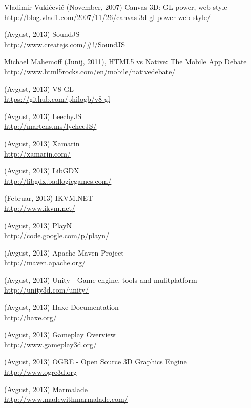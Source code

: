 \begin{thebibliography}{1}
 Vladimir Vukićević (November, 2007) Canvas 3D: GL power, web-style
\\ \url{http://blog.vlad1.com/2007/11/26/canvas-3d-gl-power-web-style/}

 (Avgust, 2013) SoundJS
\\ \url{http://www.createjs.com/\#!/SoundJS}

 Michael Mahemoff (Junij, 2011), HTML5 vs Native: The Mobile App Debate
\\ \url{http://www.html5rocks.com/en/mobile/nativedebate/}

 (Avgust, 2013) V8-GL 
\\ \url{https://github.com/philogb/v8-gl}

 (Avgust, 2013) LeechyJS 
\\ \url{http://martens.ms/lycheeJS/}

 (Avgust, 2013) Xamarin
\\ \url{http://xamarin.com/}

 (Avgust, 2013) LibGDX 
\\ \url{http://libgdx.badlogicgames.com/}

 (Februar, 2013) IKVM.NET
\\ \url{http://www.ikvm.net/}

 (Avgust, 2013) PlayN 
\\ \url{http://code.google.com/p/playn/}

 (Avgust, 2013) Apache Maven Project
\\ \url{http://maven.apache.org/}

 (Avgust, 2013) Unity - Game engine, tools and mulitplatform
\\ \url{http://unity3d.com/unity/}

 (Avgust, 2013) Haxe Documentation
\\ \url{http://haxe.org/}

 (Avgust, 2013) Gameplay Overview
\\ \url{http://www.gameplay3d.org/}

 (Avgust, 2013) OGRE - Open Source 3D Graphics Engine
\\ \url{http://www.ogre3d.org}

 (Avgust, 2013) Marmalade
\\ \url{http://www.madewithmarmalade.com/}


\end{thebibliography}
